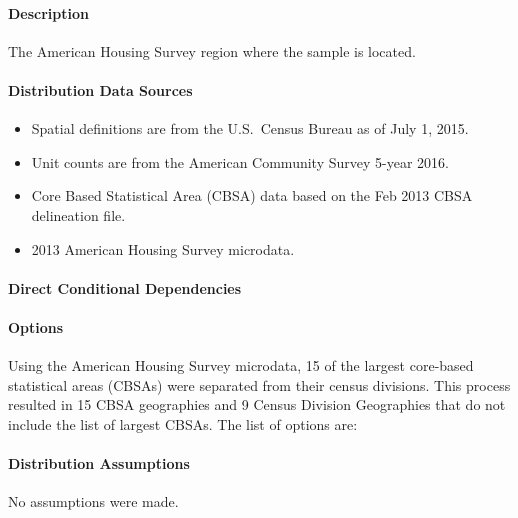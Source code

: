 \paragraph{Description}
% 
The American Housing Survey region where the sample is located.

\paragraph{Distribution Data Sources}
% 
\begin{itemize}
    \item Spatial definitions are from the U.S.~Census Bureau as of July 1, 2015.
    \item Unit counts are from the American Community Survey 5-year 2016.
    \item Core Based Statistical Area (CBSA) data based on the Feb 2013 CBSA delineation file.
    \item 2013 American Housing Survey microdata.
\end{itemize}

\paragraph{Direct Conditional Dependencies}


\paragraph{Options}
Using the American Housing Survey microdata, 15 of the largest core-based statistical areas (CBSAs) were separated from their census divisions. This process resulted in 15 CBSA geographies and 9 Census Division Geographies that do not include the list of largest CBSAs. The list of options are:



\paragraph{Distribution Assumptions}
% 
No assumptions were made.
